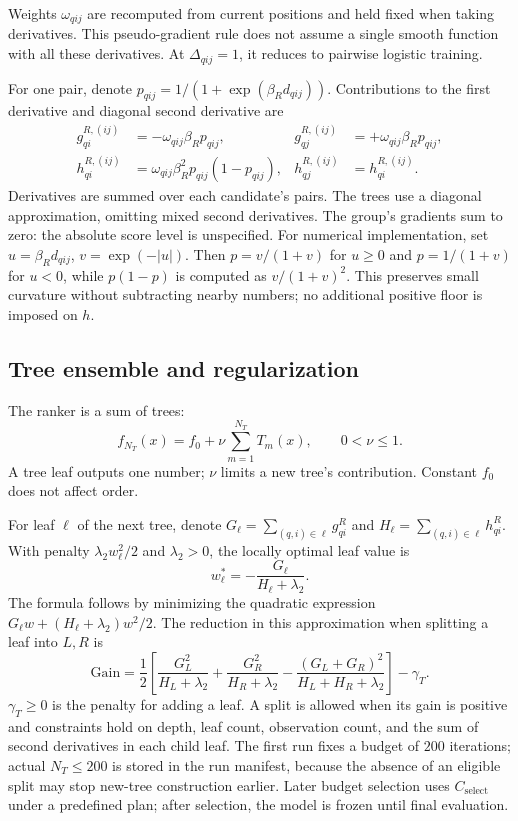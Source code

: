 \documentclass[12pt,a4paper]{article}
\theoremstyle{plainru}
\begin{document}
Weights $\omega_{qij}$ are recomputed from current positions
and held fixed when taking derivatives. This pseudo-gradient rule
does not assume a single smooth function with all these derivatives.
At $\Delta_{qij}=1$, it reduces to pairwise logistic training.

For one pair, denote
$p_{qij}=1/(1+\exp(\beta_Rd_{qij}))$.
Contributions to the first derivative and diagonal second derivative are
\begin{align}\label{eq:model-lambda-derivatives}
g_{qi}^{R,(ij)}&=-\omega_{qij}\beta_Rp_{qij},&
g_{qj}^{R,(ij)}&=+\omega_{qij}\beta_Rp_{qij},\\
h_{qi}^{R,(ij)}&=\omega_{qij}\beta_R^2p_{qij}(1-p_{qij}),&
h_{qj}^{R,(ij)}&=h_{qi}^{R,(ij)}.\nonumber
\end{align}
Derivatives are summed over each candidate's pairs. The trees use
a diagonal approximation, omitting mixed second derivatives.
The group's gradients sum to zero: the absolute score level is unspecified.
For numerical implementation, set $u=\beta_Rd_{qij}$,
$v=\exp(-|u|)$. Then $p=v/(1+v)$ for $u\ge0$ and $p=1/(1+v)$
for $u<0$, while $p(1-p)$ is computed as $v/(1+v)^2$.
This preserves small curvature without subtracting nearby numbers;
no additional positive floor is imposed on $h$.

\subsection{Tree ensemble and regularization}

The ranker is a sum of trees:
\begin{equation}\label{eq:model-boosted-trees}
f_{N_T}(x)=f_0+\nu\sum_{m=1}^{N_T} T_m(x),\qquad 0<\nu\le1.
\end{equation}
A tree leaf outputs one number; $\nu$ limits a new tree's contribution.
Constant $f_0$ does not affect order.

For leaf $\ell$ of the next tree, denote
$G_\ell=\sum_{(q,i)\in\ell}g_{qi}^{R}$ and
$H_\ell=\sum_{(q,i)\in\ell}h_{qi}^{R}$.
With penalty $\lambda_2 w_\ell^2/2$ and $\lambda_2>0$,
the locally optimal leaf value is
\begin{equation}\label{eq:model-newton-leaf}
w_\ell^*=-\frac{G_\ell}{H_\ell+\lambda_2}.
\end{equation}
The formula follows by minimizing the quadratic expression
$G_\ell w+(H_\ell+\lambda_2)w^2/2$.
The reduction in this approximation when splitting a leaf into $L,R$ is
\begin{equation}\label{eq:model-tree-gain}
\mathrm{Gain}=\frac12\left[
\frac{G_L^2}{H_L+\lambda_2}+
\frac{G_R^2}{H_R+\lambda_2}-
\frac{(G_L+G_R)^2}{H_L+H_R+\lambda_2}\right]-\gamma_T.
\end{equation}
$\gamma_T\ge0$ is the penalty for adding a leaf.
A split is allowed when its gain is positive and constraints hold
on depth, leaf count, observation count,
and the sum of second derivatives in each child leaf.
The first run fixes a budget of $200$ iterations; actual
$N_T\le200$ is stored in the run manifest, because the absence of an eligible
split may stop new-tree construction earlier.
Later budget selection uses \(C_{\mathrm{select}}\) under a predefined
plan; after selection, the model is frozen until final evaluation.
\end{document}
